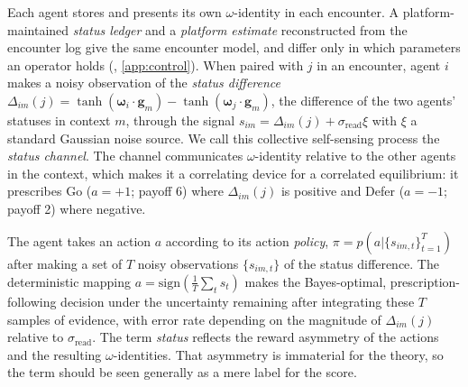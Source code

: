 \documentclass[
  aps,prx,
  reprint,
  superscriptaddress,
  nofootinbib,
  longbibliography
]{revtex4-2}
\newcommand{\w}{\bm{\omega}}
\newcommand{\g}{\mathbf{g}}
\newcommand{\sread}{\sigma_{\mathrm{read}}}
\newcommand{\sign}{\mathrm{sign}}
\newcommand{\smref}[1]{\cite[Sec.~#1]{SM}}
\begin{document}
Each agent stores and presents its own $\omega$-identity in each encounter. A platform-maintained \emph{status ledger} and a \emph{platform estimate} reconstructed from the encounter log give the same encounter model, and differ only in which parameters an operator holds (\smref{S4}, \cref{app:control}). When paired with $j$ in an encounter, agent $i$ makes a noisy observation of the \emph{status difference} $\Delta_{im}(j)=\tanh(\w_i\cdot\g_m)-\tanh(\w_j\cdot\g_m)$, the difference of the two agents' statuses in context $m$, through the signal $s_{im}=\Delta_{im}(j)+\sread\xi$ with $\xi$ a standard Gaussian noise source. We call this collective self-sensing process the \emph{status channel}. The channel communicates $\omega$-identity relative to the other agents in the context, which makes it a correlating device for a correlated equilibrium: it prescribes Go ($a=+1$; payoff 6) where $\Delta_{im}(j)$ is positive and Defer ($a=-1$; payoff 2) where negative.

The agent takes an action $a$ according to its action \emph{policy}, $\pi=p(a|\{s_{im,t}\}_{t=1}^T)$ after making a set of $T$ noisy observations $\{s_{im,t}\}$ of the status difference. The deterministic mapping $a=\sign(\tfrac1T\sum_{t}s_t)$ makes the Bayes-optimal, prescription-following decision under the uncertainty remaining after integrating these $T$ samples of evidence, with error rate depending on the magnitude of $\Delta_{im}(j)$ relative to $\sread$. The term \emph{status} reflects the reward asymmetry of the actions and the resulting $\omega$-identities. That asymmetry is immaterial for the theory, so the term should be seen generally as a mere label for the score.
\end{document}
